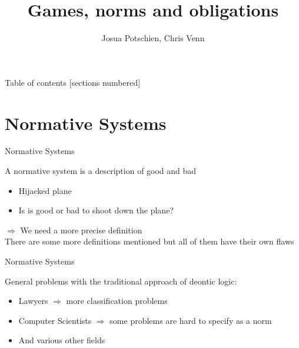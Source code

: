\documentclass[10pt]{beamer}
\title{Games, norms and obligations}
\date{}
\author{Josua Potschien, Chris Venn}
\begin{document}
\maketitle


\begin{frame}{Table of contents}
  [sections numbered]
  \tableofcontents%
\end{frame}


\section[Normative Systems]{Normative Systems}
\begin{frame}[fragile]{Normative Systems}
\begin{definition}
A normative system is a description of good and
bad
\end{definition}
\begin{itemize}
    \item Hijacked plane
    \item Is is good or bad to shoot down the plane?
\end{itemize}
$\Rightarrow$ We need a more precise definition \\
There are some more definitions mentioned but all of them have their own flaws
\end{frame}

\begin{frame}[fragile]{Normative Systems}

General problems with the traditional approach of deontic logic:
\begin{itemize}
    \item Lawyers $\Rightarrow$ more classification problems
    \item Computer Scientists $\Rightarrow$ some problems are hard to specify as a norm
    \item And various other fields
\end{itemize}
\end{frame}
\end{document}
